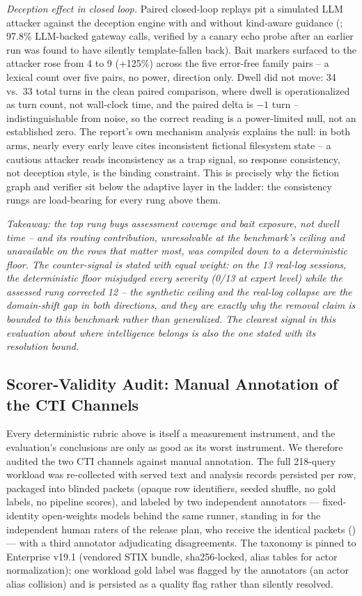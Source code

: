 \emph{Deception effect in closed loop.} Paired closed-loop replays pit a
simulated LLM attacker against the deception engine with and without
kind-aware guidance (; 97.8\%
LLM-backed gateway calls, verified by a canary echo probe after an
earlier run was found to have silently template-fallen back). Bait
markers surfaced to the attacker rose from 4 to 9 (+125\%) across the
five error-free family pairs -- a lexical count over five pairs, no
power, direction only. Dwell did not move: 34 vs.\ 33 total turns
in the clean paired comparison, where dwell is operationalized as turn
count, not wall-clock time, and the paired delta is $-1$ turn --
indistinguishable from noise, so the correct reading is a
power-limited null, not an established zero. The report's own mechanism analysis
explains the null: in both arms, nearly every early leave cites
inconsistent fictional filesystem state -- a cautious attacker reads
inconsistency as a trap signal, so response consistency, not deception
style, is the binding constraint. This is precisely why the fiction
graph and verifier sit below the adaptive layer in the ladder: the
consistency rungs are load-bearing for every rung above them.

\emph{Takeaway: the top rung buys assessment coverage and bait exposure,
not dwell time -- and its routing contribution, unresolvable at the
benchmark's ceiling and unavailable on the rows that matter most, was
compiled down to a deterministic floor. The counter-signal is stated
with equal weight: on the 13 real-log sessions, the deterministic floor
misjudged every severity (0/13 at expert level) while the assessed rung
corrected 12 -- the synthetic ceiling and the real-log collapse are the
domain-shift gap in both directions, and they are exactly why the
removal claim is bounded to this benchmark rather than generalized. The
clearest signal in this
evaluation about where intelligence belongs is also the one stated with
its resolution bound.}

\subsection{Scorer-Validity Audit: Manual Annotation of the CTI
Channels}
\label{sec:scorer-audit}

Every deterministic rubric above is itself a measurement instrument,
and the evaluation's conclusions are only as good as its worst
instrument. We therefore audited the two CTI channels against manual
annotation. The full 218-query workload was re-collected with served
text and analysis records persisted per row, packaged into blinded
packets (opaque row identifiers, seeded shuffle, no gold labels, no
pipeline scores), and labeled by two independent annotators ---
fixed-identity open-weights models behind the same runner, standing in
for the independent human raters of the release plan, who receive the
identical packets () --- with a
third annotator adjudicating disagreements. The taxonomy is pinned to
\attck{} Enterprise v19.1 (vendored STIX bundle, sha256-locked, alias
tables for actor normalization); one workload gold label was flagged by
the annotators (an actor alias collision) and is persisted as a quality
flag rather than silently resolved.

